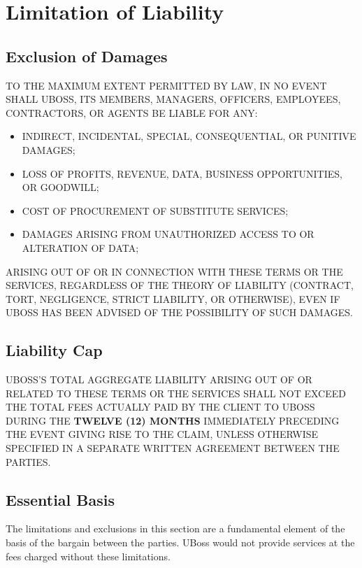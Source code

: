 \documentclass[11pt,letterpaper,parskip=half]{scrartcl}
\begin{document}
\section{Limitation of Liability}

\subsection{Exclusion of Damages}

TO THE MAXIMUM EXTENT PERMITTED BY LAW, IN NO EVENT SHALL UBOSS, ITS MEMBERS, MANAGERS, OFFICERS, EMPLOYEES, CONTRACTORS, OR AGENTS BE LIABLE FOR ANY:

\begin{itemize}[nosep, leftmargin=1.5em]
    \item INDIRECT, INCIDENTAL, SPECIAL, CONSEQUENTIAL, OR PUNITIVE DAMAGES;
    \item LOSS OF PROFITS, REVENUE, DATA, BUSINESS OPPORTUNITIES, OR GOODWILL;
    \item COST OF PROCUREMENT OF SUBSTITUTE SERVICES;
    \item DAMAGES ARISING FROM UNAUTHORIZED ACCESS TO OR ALTERATION OF DATA;
\end{itemize}

ARISING OUT OF OR IN CONNECTION WITH THESE TERMS OR THE SERVICES, REGARDLESS OF THE THEORY OF LIABILITY (CONTRACT, TORT, NEGLIGENCE, STRICT LIABILITY, OR OTHERWISE), EVEN IF UBOSS HAS BEEN ADVISED OF THE POSSIBILITY OF SUCH DAMAGES.

\subsection{Liability Cap}

UBOSS'S TOTAL AGGREGATE LIABILITY ARISING OUT OF OR RELATED TO THESE TERMS OR THE SERVICES SHALL NOT EXCEED THE TOTAL FEES ACTUALLY PAID BY THE CLIENT TO UBOSS DURING THE \textbf{TWELVE (12) MONTHS} IMMEDIATELY PRECEDING THE EVENT GIVING RISE TO THE CLAIM, UNLESS OTHERWISE SPECIFIED IN A SEPARATE WRITTEN AGREEMENT BETWEEN THE PARTIES.

\subsection{Essential Basis}

The limitations and exclusions in this section are a fundamental element of the basis of the bargain between the parties. UBoss would not provide services at the fees charged without these limitations.
\end{document}
